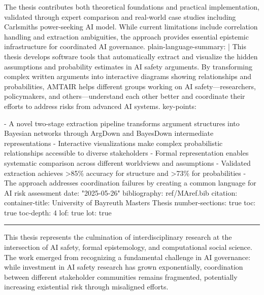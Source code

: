 \documentclass[
  11pt,
  letterpaper,
]{book}
\newenvironment{Shaded}{\begin{snugshade}}{\end{snugshade}}
\newcommand{\NormalTok}[1]{\textcolor[rgb]{0.00,0.23,0.31}{#1}}
\newcommand{\SpecialStringTok}[1]{\textcolor[rgb]{0.13,0.47,0.30}{#1}}
\begin{document}
\begin{Shaded}
\begin{Highlighting}[]
\NormalTok{The thesis contributes both theoretical foundations and practical implementation, validated through expert comparison and real{-}world case studies including Carlsmith\textquotesingle{}s power{-}seeking AI model. While current limitations include correlation handling and extraction ambiguities, the approach provides essential epistemic infrastructure for coordinated AI governance. plain{-}language{-}summary: | This thesis develops software tools that automatically extract and visualize the hidden assumptions and probability estimates in AI safety arguments. By transforming complex written arguments into interactive diagrams showing relationships and probabilities, AMTAIR helps different groups working on AI safety—researchers, policymakers, and others—understand each other better and coordinate their efforts to address risks from advanced AI systems. key{-}points:}

\SpecialStringTok{{-} }\NormalTok{A novel two{-}stage extraction pipeline transforms argument structures into Bayesian networks through ArgDown and BayesDown intermediate representations}
\SpecialStringTok{{-} }\NormalTok{Interactive visualizations make complex probabilistic relationships accessible to diverse stakeholders}
\SpecialStringTok{{-} }\NormalTok{Formal representation enables systematic comparison across different worldviews and assumptions}
\SpecialStringTok{{-} }\NormalTok{Validated extraction achieves \textgreater{}85\% accuracy for structure and \textgreater{}73\% for probabilities}
\SpecialStringTok{{-} }\NormalTok{The approach addresses coordination failures by creating a common language for AI risk assessment date: "2025{-}05{-}26" bibliography: ref/MAref.bib citation: container{-}title: University of Bayreuth Master\textquotesingle{}s Thesis number{-}sections: true toc: true toc{-}depth: 4 lof: true lot: true}
\end{Highlighting}
\end{Shaded}

\begin{center}\rule{0.5\linewidth}{0.5pt}\end{center}

This thesis represents the culmination of interdisciplinary research at
the intersection of AI safety, formal epistemology, and computational
social science. The work emerged from recognizing a fundamental
challenge in AI governance: while investment in AI safety research has
grown exponentially, coordination between different stakeholder
communities remains fragmented, potentially increasing existential risk
through misaligned efforts.
\end{document}
